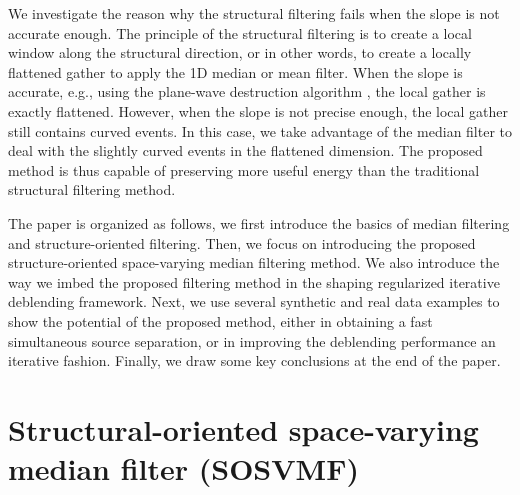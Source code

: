 We investigate the reason why the structural filtering fails when the slope is not accurate enough. The principle of the structural filtering is to create a local window along the structural direction, or in other words, to create a locally flattened gather to apply the 1D median or mean filter. When the slope is accurate, e.g., using the plane-wave destruction algorithm \cite[]{fomel2002pwd}, the local gather is exactly flattened. However, when the slope is not precise enough, the local gather still contains curved events. In this case, we take advantage of the  median filter to deal with the slightly curved events in the flattened dimension. The proposed method is thus capable of preserving more useful energy than the traditional structural filtering method.

The paper is organized as follows, we first introduce the basics of median filtering and structure-oriented filtering. Then, we focus on introducing the proposed structure-oriented space-varying median filtering method. We also introduce the way we imbed the proposed filtering method in the shaping regularized iterative deblending framework. Next, we use several synthetic and real data examples to show the potential of the proposed method, either in obtaining a fast simultaneous source separation, or in improving the deblending performance  an iterative fashion. Finally, we draw some key conclusions at the end of the paper.


\section{Structural-oriented space-varying median filter (SOSVMF)}
